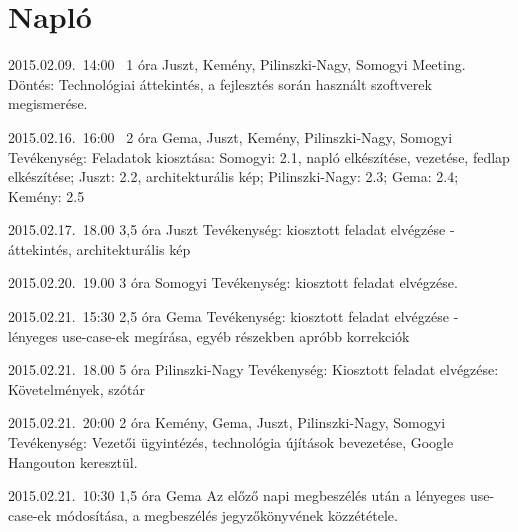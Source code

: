 %
\section{Napló}

\begin{naplo}

\bejegyzes
{2015.02.09.~14:00~} %
{1 óra} %
{Juszt, Kemény, Pilinszki-Nagy, Somogyi} %
{Meeting. Döntés: Technológiai áttekintés, a fejlesztés során használt szoftverek megismerése.} %

\bejegyzes
{2015.02.16.~16:00~}
{2 óra}
{Gema, Juszt, Kemény, Pilinszki-Nagy, Somogyi} %
{Tevékenység: Feladatok kiosztása: Somogyi: 2.1, napló elkészítése, vezetése, fedlap elkészítése; Juszt: 2.2, architekturális kép; Pilinszki-Nagy: 2.3; Gema: 2.4; Kemény: 2.5}

\bejegyzes
{2015.02.17.~18.00}
{3,5 óra}
{Juszt}
{Tevékenység: kiosztott feladat elvégzése - áttekintés, architekturális kép}

\bejegyzes
{2015.02.20.~19.00}
{3 óra}
{Somogyi}
{Tevékenység: kiosztott feladat elvégzése.}

\bejegyzes
{2015.02.21.~15:30}
{2,5 óra}
{Gema}
{Tevékenység: kiosztott feladat elvégzése - lényeges use-case-ek megírása, egyéb részekben apróbb korrekciók}

\bejegyzes
{2015.02.21.~18.00}
{5 óra}
{Pilinszki-Nagy}
{Tevékenység: \newline Kiosztott feladat elvégzése: Követelmények, szótár}

\bejegyzes
{2015.02.21.~20:00}
{2 óra}
{Kemény, Gema, Juszt, Pilinszki-Nagy, Somogyi}
{Tevékenység: Vezetői ügyintézés, technológia újítások bevezetése, Google Hangouton keresztül.}

\bejegyzes
{2015.02.21.~10:30}
{1,5 óra}
{Gema}
{Az előző napi megbeszélés után a lényeges use-case-ek módosítása, a megbeszélés jegyzőkönyvének közzététele.}


\end{naplo}

